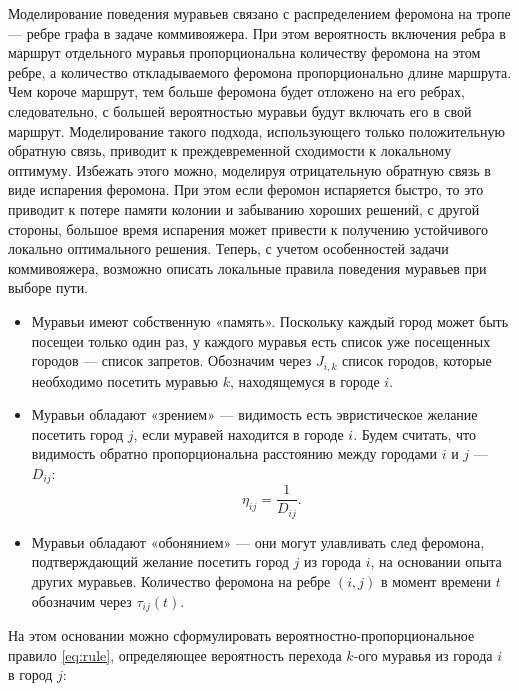 \documentclass[12pt]{report}
\begin{document}
Моделирование поведения муравьев связано с распределением феромона на тропе — ребре графа в задаче коммивояжера. При этом вероятность включения ребра в маршрут отдельного муравья пропорциональна количеству феромона на этом ребре, а количество откладываемого феромона пропорционально длине маршрута. Чем короче маршрут, тем больше феромона будет отложено на его ребрах, следовательно, с большей вероятностью муравьи будут включать его в свой маршрут. Моделирование такого подхода, использующего только положительную обратную связь, приводит к преждевременной сходимости к локальному оптимуму. Избежать этого можно, моделируя отрицательную обратную связь в виде испарения феромона. При этом если феромон испаряется быстро, то это приводит к потере памяти колонии и забыванию хороших решений, с другой стороны, большое время испарения может привести к получению устойчивого локально оптимального решения. Теперь, с учетом особенностей задачи коммивояжера, возможно описать локальные правила поведения муравьев при выборе пути.

\begin{itemize}
	\item Муравьи имеют собственную «память». Поскольку каждый город может быть посещеи только один раз, у каждого муравья есть список уже посещенных городов --- список запретов. Обозначим через $J_{i,k}$ список городов, которые необходимо посетить муравью $k$, находящемуся в городе $i$.
	\item Муравьи обладают «зрением» --- видимость есть эвристическое желание посетить город $j$, если муравей находится в городе $i$. Будем считать, что видимость обратно пропорциональна расстоянию между городами $i$ и $j$ --- $D_{ij}$: 
	\begin{equation}
	\label{eq:vision}
	\eta_{ij} = \frac{1}{D_{ij}}.
	\end{equation}
	\item Муравьи обладают «обонянием» — они могут улавливать след феромона, подтверждающий желание посетить город $j$ из города $i$, на основании опыта других муравьев. Количество феромона на ребре $(i,j)$ в момент времени $t$ обозначим через $\tau_{ij}(t)$.
\end{itemize}

На этом  основании можно сформулировать вероятностно-пропорциональное правило \ref{eq:rule}, определяющее вероятность перехода $k$-ого муравья из города $i$ в город $j$:
\end{document}

